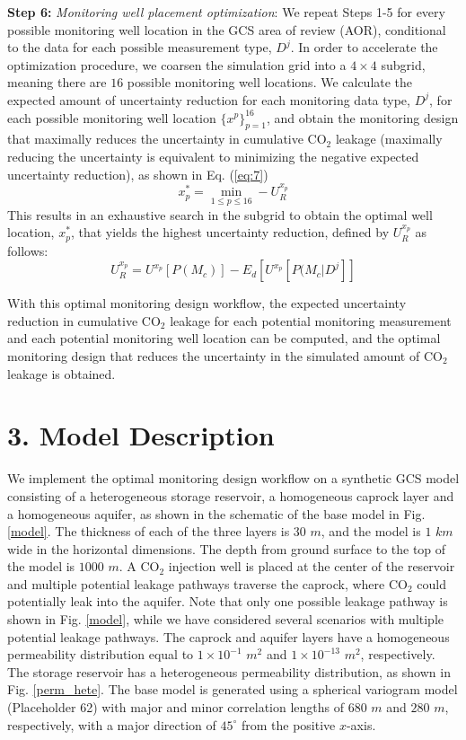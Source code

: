 \documentclass[10pt, twoside]{article}
\begin{document}
\textbf{Step 6:} \textit{Monitoring well placement optimization}: We repeat Steps 1-5 for every possible monitoring well location in the GCS area of review (AOR), conditional to the data for each possible measurement type, $D^j$. In order to accelerate the optimization procedure, we coarsen the simulation grid into a $4\times4$ subgrid, meaning there are $16$ possible monitoring well locations. We calculate the expected amount of uncertainty reduction for each monitoring data type, $D^j$, for each possible monitoring well location $\{{x^p}\}_{p=1}^{16}$, and obtain the monitoring design that maximally reduces the uncertainty in cumulative CO$_2$ leakage (maximally reducing the uncertainty is equivalent to minimizing the negative expected uncertainty reduction), as shown in Eq. (\ref{eq:7})
\begin{equation} \label{eq:7}
    x_p^* = \min\limits_{1\leq p \leq 16} -U_R^{x_p}
\end{equation}
This results in an exhaustive search in the subgrid to obtain the optimal well location, $x_p^*$, that yields the highest uncertainty reduction, defined by $U_R^{x_p}$ as follows:
\begin{equation} \label{eq:8}
    U_R^{x_p} = U^{x_p}[P(M_c)] - E_d[U^{x_p}[P(M_c \vert D^j]]
\end{equation}

With this optimal monitoring design workflow, the expected uncertainty reduction in cumulative CO$_2$ leakage for each potential monitoring measurement and each potential monitoring well location can be computed, and the optimal monitoring design that reduces the uncertainty in the simulated amount of CO$_2$ leakage is obtained.

\section*{3. Model Description}

We implement the optimal monitoring design workflow on a synthetic GCS model consisting of a heterogeneous storage reservoir, a homogeneous caprock layer and a homogeneous aquifer, as shown in the schematic of the base model in Fig. \ref{model}. The thickness of each of the three layers is $30$ $m$, and the model is $1$ $km$ wide in the horizontal dimensions. The depth from ground surface to the top of the model is $1000$ $m$. A CO$_2$ injection well is placed at the center of the reservoir and multiple potential leakage pathways traverse the caprock, where CO$_2$ could potentially leak into the aquifer. Note that only one possible leakage pathway is shown in Fig. \ref{model}, while we have considered several scenarios with multiple potential leakage pathways. The caprock and aquifer layers have a homogeneous permeability distribution equal to $1\times10^{-1}$ $m^2$ and $1\times10^{-13}$ $m^2$, respectively. The storage reservoir has a heterogeneous permeability distribution, as shown in Fig. \ref{perm_hete}. The base model is generated using a spherical variogram model (Placeholder 62) with major and minor correlation lengths of $680$ $m$ and $280$ $m$, respectively, with a major direction of $45^\circ$ from the positive $x$-axis.
\end{document}
